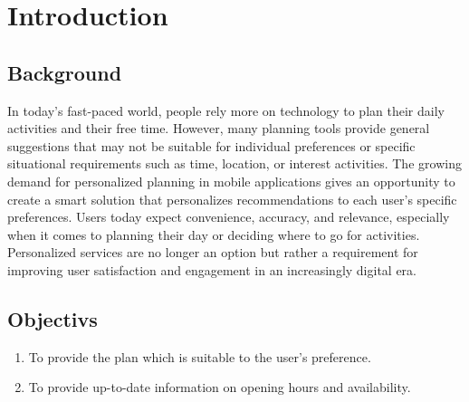 \chapter{Introduction}
\section{Background}
In today's fast-paced world, people rely more on technology to plan their daily activities and
their free time. However, many planning tools provide general suggestions that may not be
suitable for individual preferences or specific situational requirements such as time, location, or
interest activities. The growing demand for personalized planning in mobile applications gives
an opportunity to create a smart solution that personalizes recommendations to each user's
specific preferences. Users today expect convenience, accuracy, and relevance, especially when
it comes to planning their day or deciding where to go for activities. Personalized services are no
longer an option but rather a requirement for improving user satisfaction and engagement in an
increasingly digital era.
\section{Objectivs}
\begin{enumerate}
    \item To provide the plan which is suitable to the user’s preference.
    \item To provide up-to-date information on opening hours and availability.
\end{enumerate}

